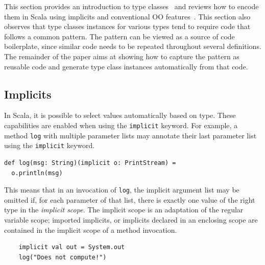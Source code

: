 \documentclass[preprint]{sigplanconf}
\newcommand{\term}[1]{\mbox{\texttt{#1}}}
\begin{document}
This section provides an introduction to type classes~\cite{} and
reviews how to encode them in Scala using implicits and conventional
OO features~\cite{Oliveira2010}.  This section also observes that type
classes instances for various types tend to require code that follows
a common pattern. The pattern can be viewed as a source of code
boilerplate, since similar code needs to be repeated throughout several
definitions. The remainder of the paper aims at showing how
to capture the pattern as reusable code and generate type class
instances automatically from that code.


%
%

\subsection{Implicits}
\label{sec:implicits}

In Scala, it is possible to select values
automatically based on type. These capabilities are enabled when using the
\term{implicit} keyword. For example, a method \term{log} with multiple
parameter lists may annotate their last parameter list using the
\term{implicit} keyword.%

\begin{lstlisting}
def log(msg: String)(implicit o: PrintStream) =
  o.println(msg)
\end{lstlisting}

This means that in an invocation of \term{log}, the implicit argument list may
be omitted if, for each parameter of that list, there is exactly one value of
the right type in the {\em implicit scope}. The implicit scope is an
adaptation of the regular variable scope; imported implicits, or implicits
declared in an enclosing scope are contained in the implicit scope of a method
invocation.

\begin{lstlisting}
    implicit val out = System.out
    log("Does not compute!")
\end{lstlisting}
\end{document}
